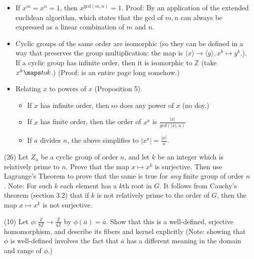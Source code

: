 \documentclass[1    0pt, answers]{exam} \renewcommand{\baselinestretch}{1.05}
\theoremstyle{plain}
\theoremstyle{definition}
\begin{document}
\begin{questions}
\begin{itemize}
\item If $x^m = x^n = 1$, then $x^{\text{gcd}(m,n)} = 1$. Proof: By an application of the extended euclidean algorithm, which states that the gcd of $m,n$ can always be expressed as a linear combination of $m$ and $n$.
\item Cyclic groups of the same order are isomorphic (so they can be defined in a way that preserves the group multiplication: the map is $\langle x \rangle \to \langle y \rangle, x^k \mapsto y^k$.). If a cyclic group has infinite order, then it is isomorphic to $\mathbb{Z}$ (take $x^k \maps to k$.) (Proof: is an entire page long somehow.)
\item Relating $x$ to powers of $x$ (Proposition 5).
\begin{itemize}
     \item If $x$ has infinite order, then so does any power of $x$ (no doy.)
     \item If $x$ has finite order, then the order of $x^a$ is $\frac{|x|}{gcd(|x|, a)}$
     \item If $a$ divides $n$, the above simplifies to $|x^a| = \frac{|x|}{a}$.
\end{itemize}
\end{itemize}


\question (26) Let $Z_n$ be a cyclic group of order $n$, and let $k$ be an integer which is relatively prime to $n$. Prove that the map $x \mapsto x^k$ is surjective. Then use Lagrange's Theorem to prove that the same is true for \emph{any} finite group of order $n$. Note: For such $k$ each element has a $k$th root in $G$. It follows from Cauchy's theorem (section 3.2) that if $k$ is not relatively prime to the order of $G$, then the map $x \mapsto x^k$ is not surjective.


\question (10) Let $\phi : \frac{\mathbb{Z}}{8 \mathbb{Z}} \to \frac{\mathbb{Z}}{4 \mathbb{Z}}$ by $\phi(\bar{a}) = \bar{a}$. Show that this is a well-defined, srjective homomorphism, and describe its fibers and kernel explicitly (Note: showing that $\phi$ is well-defined involves the fact that $\bar{a}$ has a different meaning in the domain and range of $\phi$.)


\end{questions}
\end{document}
